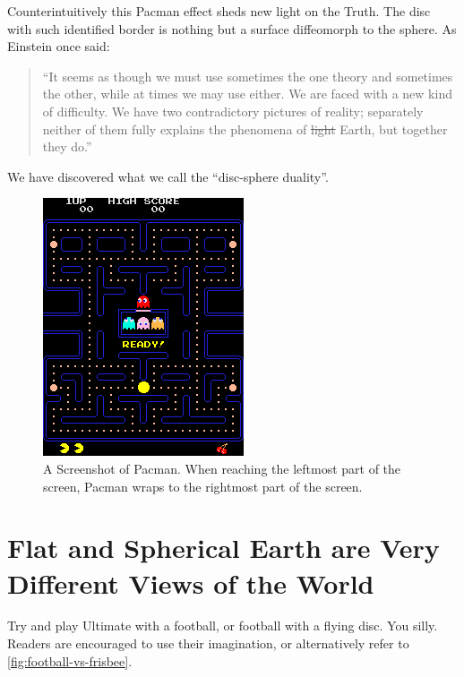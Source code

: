 \documentclass{article}
\begin{document}
Counterintuitively this Pacman effect sheds new light on the Truth. The disc
with such identified border is nothing but a surface diffeomorph to the sphere.
As Einstein once said:

\begin{quote}
``It seems as though we must use sometimes the one theory and sometimes the
other, while at times we may use either. We are faced with a new kind of
difficulty. We have two contradictory pictures of reality; separately neither
of them fully explains the phenomena of \sout{light} Earth, but together they do.''
\end{quote}

We have discovered what we call the ``disc-sphere duality''.

\begin{figure}[t]
  \centering
  \includegraphics{images/pacman.png}
  \caption{A Screenshot of Pacman. When reaching the leftmost part of the
    screen, Pacman wraps to the rightmost part of the screen.}
  \label{fig:pacman-screenshot}
\end{figure}

\section{Flat and Spherical Earth are Very Different Views of the World}
Try and play Ultimate with a football, or football with a flying disc. You silly.
Readers are encouraged to use their imagination, or alternatively refer to
\cref{fig:football-vs-frisbee}.
\end{document}
